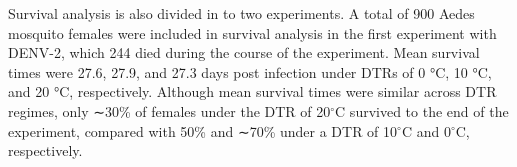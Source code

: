 \documentclass[review]{elsarticle}
\begin{document}
Survival analysis is also divided in to two experiments. A total of 900 Aedes mosquito females were included in survival analysis in the first experiment with DENV-2, which 244 died during the course of the experiment. Mean survival times were 27.6, 27.9, and 27.3 days post infection under DTRs of 0 °C, 10 °C, and 20 °C, respectively. Although mean survival times were similar across DTR regimes, only ∼30\% of females under the DTR of 20$^{\circ}$C survived to the end of the experiment, compared with 50\% and ∼70\% under a DTR of 10$^{\circ}$C and 0$^{\circ}$C, respectively. 

%
\end{document}
